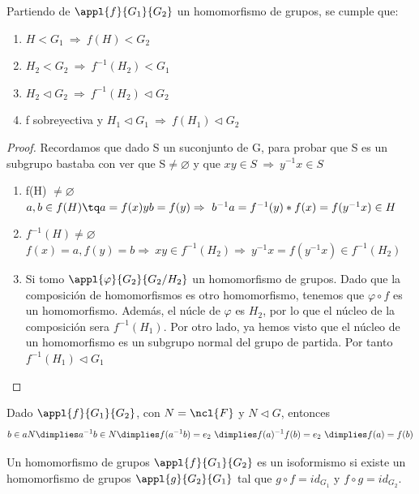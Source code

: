 \documentclass[a4paper,10pt]{apuntes}
\begin{document}
Partiendo de $\appl{f}{G_1}{G_2}$  un homomorfismo de grupos, se cumple que:
\begin{enumerate}
 \item $H<G_1 \ \Rightarrow \ f(H)<G_2$
 \item $H_2<G_2 \ \Rightarrow \ f^{-1}(H_2)<G_1$
 \item $H_2 \vartriangleleft G_2 \ \Rightarrow \ f^{-1}(H_2)\vartriangleleft G_2$
 \item f sobreyectiva y $H_1 \vartriangleleft G_1 \ \Rightarrow \ f(H_1)\vartriangleleft G_2$
\end{enumerate}
\begin{proof}
Recordamos que dado S un suconjunto de G, para probar que S es un subgrupo bastaba con ver que S$\neq \varnothing$  y que $xy\in S \ \Rightarrow \ y^{-1}x\in S $
 \begin{enumerate}
  \item f(H) $\neq \varnothing$\\
  $a,b\in f(H) \tq a=f(x) y b=f(y) \Rightarrow \ b^{-1}a=f^{-1}(y)*f(x)=f(y^{-1}x)\in H$
  \item $f^{-1}(H)\neq \varnothing$\\
  $f(x)=a, f(y)=b \Rightarrow \ xy\in f^{-1}(H_2) \Rightarrow \ y^{-1}x=f(y^{-1}x)\in f^{-1}(H_2)$
  \item Si tomo $\appl{\varphi}{G_2}{G_2/H_2}$  un homomorfismo de grupos. Dado que la composición de homomorfismos es otro homomorfismo, 
  tenemos que $\varphi \circ f$  es un homomorfismo. Además, el núcle de $\varphi$  es $H_2$, por lo que el núcleo de la composición sera $f^{-1}(H_1)$.
  Por otro lado, ya hemos visto que el núcleo de un homomorfismo es un subgrupo normal del grupo de partida. Por tanto $f^{-1}(H_1) \vartriangleleft G_1$
 \end{enumerate}
 \end{proof}

\begin{lemma} Dado $\appl{f}{G_1}{G_2}$, con $N=\ncl{F}$ y $N \lhd G$, entonces
\[ b\in aN \dimplies  a^{-1}b\in N \dimplies f(a^{-1}b)=e_2 \ \dimplies f(a)^{-1}f(b)=e_2 \ \dimplies f(a)=f(b) \]
\end{lemma}

\begin{defn}[Isomorfismo]
Un homomorfismo de grupos $\appl{f}{G_1}{G_2}$ es un isoformismo si existe un homomorfismo de grupos $\appl{g}{G_2}{G_1}$ tal que $g\circ f = id_{G_1}$ y $f\circ g = id_{G_2}$. 
\end{defn}
\end{document}
